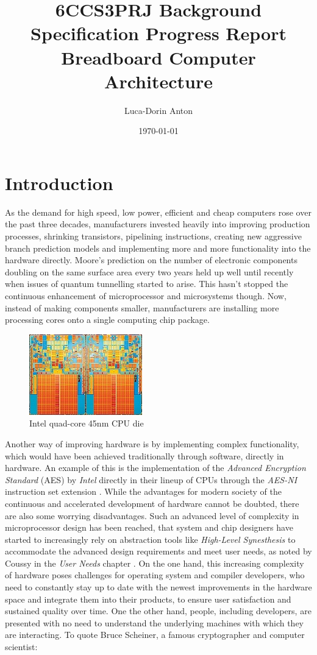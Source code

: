\documentclass[11pt]{informatics-report}
\title{6CCS3PRJ Background Specification Progress Report\\\vspace{0.2cm}Breadboard Computer Architecture}
\author{Luca-Dorin Anton}
\date{\today}
\begin{document}
\createFrontMatter
\onehalfspacing
\tableofcontents
\doublespacing


\chapter{Introduction}
As the demand for high speed, low power, efficient and cheap computers rose over the past three decades,
manufacturers invested heavily into improving production processes, shrinking transistors, pipelining
instructions, creating new aggressive branch prediction models and implementing more and more functionality
into the hardware directly. Moore's prediction on the number of electronic components doubling on the
same surface area every two years held up well until recently when issues of quantum tunnelling started to
arise. This hasn't stopped the continuous enhancement of microprocessor and microsystems though. Now, instead
of making components smaller, manufacturers are installing more processing cores onto a single computing chip
package.
\begin{figure}[ht]
  \centering
  \includegraphics{45nm_quad_core_die}
  \caption{Intel quad-core 45nm CPU die}
  \label{intel_die}
\end{figure}
\linebreak
Another way of improving hardware is by implementing complex functionality, which would have been achieved traditionally through software, directly in hardware. An example of this is the implementation of the \emph{Advanced Encryption Standard} (AES) by \emph{Intel} directly in their lineup of CPUs through the \emph{AES-NI} instruction set extension \cite{aes2012ni}.
While the advantages for modern society of the continuous and accelerated development of hardware cannot be doubted,
there are also some worrying disadvantages. Such an advanced level of complexity in microprocessor design has been reached, that system and chip designers have started to increasingly rely on abstraction tools like \emph{ High-Level Synesthesis} to accommodate the advanced design requirements and meet user needs, as noted by Coussy in the \emph{User Needs} chapter \cite{coussy2008high}. On the one hand, this increasing complexity of hardware poses challenges for operating system and compiler developers, who need to constantly stay up to date with the newest improvements in the hardware space and integrate them into their products, to ensure user satisfaction and sustained quality over time. One the other hand, people, including developers, are presented with no need to understand the underlying machines with which they are interacting. To quote Bruce Scheiner, a famous cryptographer and computer scientist:
\end{document}
